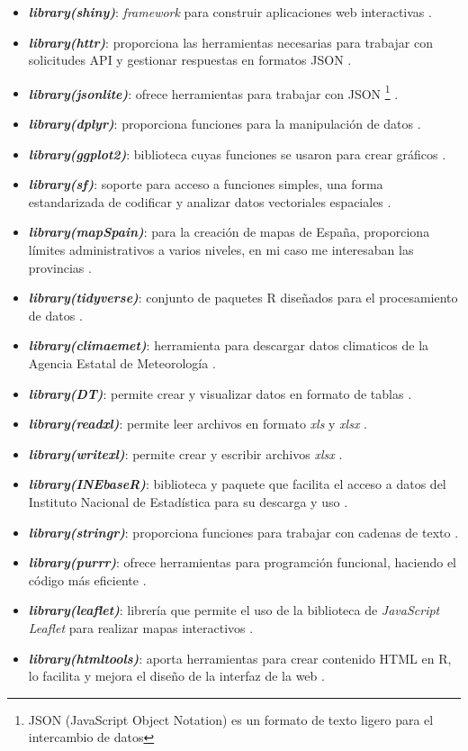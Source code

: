 \begin{itemize}
    \item \textbf{\textit{library(shiny)}}: \textit{framework} para construir aplicaciones web interactivas \cite{Shiny}.
    \item \textbf{\textit{library(httr)}}: proporciona las herramientas necesarias para trabajar con solicitudes API y gestionar respuestas en formatos JSON \cite{httr}.
    \item \textbf{\textit{library(jsonlite)}}: ofrece herramientas para trabajar con JSON \footnote{JSON (JavaScript Object Notation) es un formato de texto ligero para el intercambio de datos} \cite{Jsonlite}.
    \item \textbf{\textit{library(dplyr)}}: proporciona funciones para la manipulación de datos \cite{dplyr}.
    \item \textbf{\textit{library(ggplot2)}}: biblioteca cuyas funciones se usaron para crear gráficos \cite{ggplot2}.
    \item \textbf{\textit{library(sf)}}: soporte para acceso a funciones simples, una forma estandarizada de codificar y analizar datos vectoriales espaciales \cite{sf}.
    \item \textbf{\textit{library(mapSpain)}}: para la creación de mapas de España, proporciona límites administrativos a varios niveles, en mi caso me interesaban las provincias \cite{R-mapspain}.
    \item \textbf{\textit{library(tidyverse)}}: conjunto de paquetes R diseñados para el procesamiento de datos \cite{tidyverse}.
    \item \textbf{\textit{library(climaemet)}}: herramienta para descargar datos climaticos de la Agencia Estatal de Meteorología \cite{R-climaemet}.
    \item \textbf{\textit{library(DT)}}: permite crear y visualizar datos en formato de tablas \cite{DT}.
    \item \textbf{\textit{library(readxl)}}: permite leer archivos en formato \textit{xls} y \textit{xlsx} \cite{readxl}.
    \item \textbf{\textit{library(writexl)}}: permite crear y escribir archivos \textit{xlsx} \cite{writexl}.
    \item \textbf{\textit{library(INEbaseR)}}: biblioteca y paquete que facilita el acceso a datos del Instituto Nacional de Estadística para su descarga y uso \cite{INEbaseR}.
    \item \textbf{\textit{library(stringr)}}: proporciona funciones para trabajar con cadenas de texto \cite{stringr}.
    \item \textbf{\textit{library(purrr)}}: ofrece herramientas para programción funcional, haciendo el código más eficiente \cite{purrr}.
    \item \textbf{\textit{library(leaflet)}}: librería que permite el uso de la biblioteca de \textit{JavaScript} \textit{Leaflet} para realizar mapas interactivos \cite{leaflet}.
    \item \textbf{\textit{library(htmltools)}}: aporta herramientas para crear contenido HTML en R, lo facilita y mejora el diseño de la interfaz de la web \cite{htmltools}.
\end{itemize}

